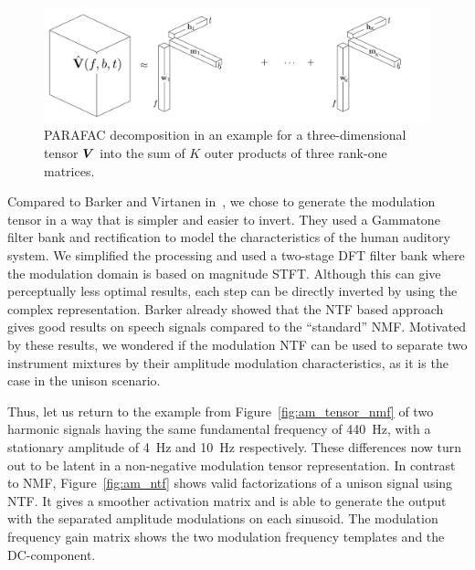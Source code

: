 \begin{figure}[!t]
  \centering
  \includegraphics[width=1\textwidth]{Chapters/06_Separation_Unknown/figures/cpd.pdf}
  \caption{PARAFAC decomposition in an example for a three-dimensional tensor \({\bm{V}}\) into the sum of \(K\) outer products of three rank-one matrices.}
  \label{fig:cpd}
\end{figure}

\par
Compared to Barker and Virtanen in~\cite{barker13}, we chose to generate the modulation tensor in a way that is simpler and easier to invert. 
They used a Gammatone filter bank and rectification to model the characteristics of the human auditory system. 
We simplified the processing and used a two-stage DFT filter bank where the modulation domain is based on magnitude \acs{STFT}. 
Although this can give perceptually less optimal results, each step can be directly inverted by using the complex representation.
Barker already showed that the \acs{NTF} based approach gives good results on speech signals compared to the ``standard'' \acs{NMF}. 
Motivated by these results, we wondered if the modulation \acs{NTF} can be used to separate two instrument mixtures by their amplitude modulation characteristics, as it is the case in the unison scenario.
\par
Thus, let us return to the example from Figure~\ref{fig:am_tensor_nmf} of two harmonic signals having the same fundamental frequency of 440~\si{\hertz}, with a stationary amplitude of 4~\si{\hertz} and 10~\si{\hertz} respectively. 
These differences now turn out to be latent in a non-negative modulation tensor representation.
In contrast to \acs{NMF}, Figure~\ref{fig:am_ntf} shows valid factorizations of a unison signal using \acs{NTF}.
It gives a smoother activation matrix and is able to generate the output with the separated amplitude modulations on each sinusoid. The modulation frequency gain matrix shows the two modulation frequency templates and the DC-component.

